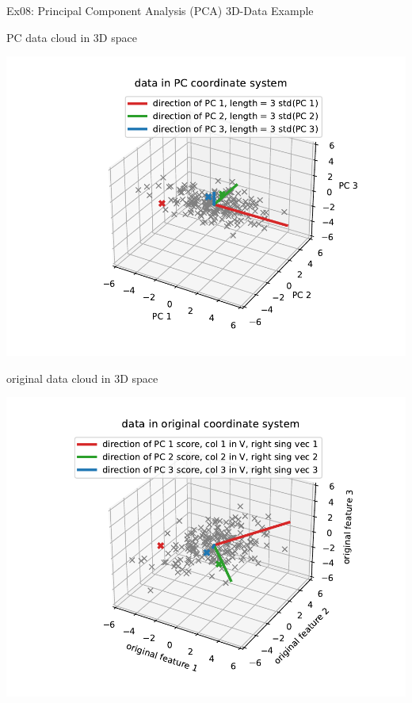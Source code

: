 \documentclass[mathserif, aspectratio=1610]{intbeamer}
\begin{document}
\begin{frame}[t]{Ex08: Principal Component Analysis (PCA) 3D-Data Example}
\begin{minipage}[t]{0.49\textwidth}
PC data cloud in 3D  space

\includegraphics[width=\textwidth]{pca_3d_pc_data.pdf}
\end{minipage}
%
\begin{minipage}[t]{0.49\textwidth}
original data cloud in 3D space

\includegraphics[width=\textwidth]{pca_3d_original_data_with_pcdir.pdf}
\end{minipage}
\end{frame}
\end{document}
